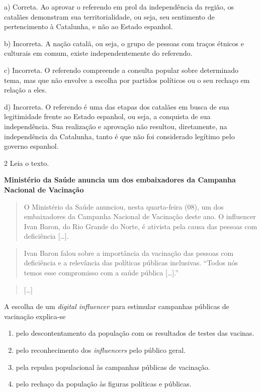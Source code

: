 a) Correta. Ao aprovar o referendo em prol da independência da região,
os catalães demonstram sua territorialidade, ou seja, seu sentimento de
pertencimento à Catalunha, e não ao Estado espanhol.

b) Incorreta. A nação catalã, ou seja, o grupo de pessoas com traços
étnicos e culturais em comum, existe independentemente do referendo.

c) Incorreta. O referendo compreende a consulta popular sobre
determinado tema, mas que não envolve a escolha por partidos políticos
ou o seu rechaço em relação a eles.

d) Incorreta. O referendo é uma das etapas dos catalães em busca de sua
legitimidade frente ao Estado espanhol, ou seja, a conquista de sua
independência. Sua realização e aprovação não resultou, diretamente, na
independência da Catalunha, tanto é que não foi considerado legítimo
pelo governo espanhol.

\num{2} Leia o texto.

\textbf{Ministério da Saúde anuncia um dos embaixadores da Campanha Nacional de Vacinação}

\begin{quote}
O Ministério da Saúde anunciou, nesta quarta-feira (08), um dos
embaixadores da Campanha Nacional de Vacinação deste ano. O influencer
Ivan Baron, do Rio Grande do Norte, é ativista pela causa das pessoas
com deficiência {[}\ldots{}{]}.
\end{quote}

\begin{quote}
Ivan Baron falou sobre a importância da vacinação das pessoas com
deficiência e a relevância das políticas públicas inclusivas. ``Todos
nós temos esse compromisso com a saúde pública {[}\ldots{}{]}.''
\end{quote}

\begin{quote}
{[}\ldots{}{]}
\end{quote}


A escolha de um \emph{digital influencer} para estimular campanhas
públicas de vacinação explica-se

\begin{enumerate}
\def\labelenumi{\alph{enumi})}
\item
  pelo descontentamento da população com os resultados de testes das
  vacinas.
\item
  pelo reconhecimento dos \emph{influencers} pelo público geral.
\item
  pela repulsa populacional às campanhas públicas de vacinação.
\item
  pelo rechaço da população às figuras políticas e públicas.
\end{enumerate}

